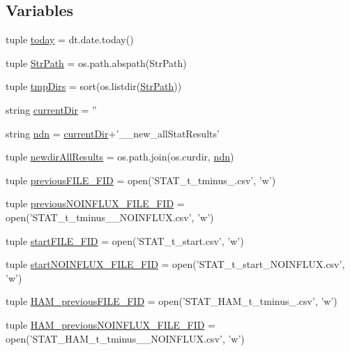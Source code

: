 \subsection*{Variables}
\begin{DoxyCompactItemize}
\item 
tuple \hyperlink{a00098_ac99ee9d8196d8a2305b9f4c795b23b97}{today} = dt.\-date.\-today()
\item 
tuple \hyperlink{a00098_ac34f3f43f888eb6620266d78ce928ceb}{Str\-Path} = os.\-path.\-abspath(Str\-Path)
\item 
tuple \hyperlink{a00098_ab71c19ee20acae0f07934a8d0e9fe50b}{tmp\-Dirs} = sort(os.\-listdir(\hyperlink{a00098_ac34f3f43f888eb6620266d78ce928ceb}{Str\-Path}))
\item 
string \hyperlink{a00098_ae98225d5c8c20399f5c3b888fa37746f}{current\-Dir} = ''
\item 
string \hyperlink{a00098_a5e117df6e0cdffdae13947622c6c4890}{ndn} = \hyperlink{a00098_ae98225d5c8c20399f5c3b888fa37746f}{current\-Dir}+'\-\_\-\_\-new\-\_\-all\-Stat\-Results'
\item 
tuple \hyperlink{a00098_a62d6cfd52b4428ab7ea4d75d43b2d49b}{newdir\-All\-Results} = os.\-path.\-join(os.\-curdir, \hyperlink{a00098_a5e117df6e0cdffdae13947622c6c4890}{ndn})
\item 
tuple \hyperlink{a00098_aba65725a1bd6d1b891b02dc7f3db2335}{previous\-F\-I\-L\-E\-\_\-\-F\-I\-D} = open('S\-T\-A\-T\-\_\-t\-\_\-tminus\-\_.\-csv', 'w')
\item 
tuple \hyperlink{a00098_a9f9485bf6f7a3734bbd110b756005b71}{previous\-N\-O\-I\-N\-F\-L\-U\-X\-\_\-\-F\-I\-L\-E\-\_\-\-F\-I\-D} = open('S\-T\-A\-T\-\_\-t\-\_\-tminus\-\_\-\_\-\-N\-O\-I\-N\-F\-L\-U\-X.\-csv', 'w')
\item 
tuple \hyperlink{a00098_a0239a9dcc4900463a0c19557bec23521}{start\-F\-I\-L\-E\-\_\-\-F\-I\-D} = open('S\-T\-A\-T\-\_\-t\-\_\-start.\-csv', 'w')
\item 
tuple \hyperlink{a00098_a44f4f158af9771fbabbbacc4f4484d32}{start\-N\-O\-I\-N\-F\-L\-U\-X\-\_\-\-F\-I\-L\-E\-\_\-\-F\-I\-D} = open('S\-T\-A\-T\-\_\-t\-\_\-start\-\_\-\-N\-O\-I\-N\-F\-L\-U\-X.\-csv', 'w')
\item 
tuple \hyperlink{a00098_a3aad86d2cdbfb6f36b4b563b190d76c9}{H\-A\-M\-\_\-previous\-F\-I\-L\-E\-\_\-\-F\-I\-D} = open('S\-T\-A\-T\-\_\-\-H\-A\-M\-\_\-t\-\_\-tminus\-\_.\-csv', 'w')
\item 
tuple \hyperlink{a00098_a621d86851e86f9c83bb0add9ec741d7f}{H\-A\-M\-\_\-previous\-N\-O\-I\-N\-F\-L\-U\-X\-\_\-\-F\-I\-L\-E\-\_\-\-F\-I\-D} = open('S\-T\-A\-T\-\_\-\-H\-A\-M\-\_\-t\-\_\-tminus\-\_\-\_\-\-N\-O\-I\-N\-F\-L\-U\-X.\-csv', 'w')

\end{DoxyCompactItemize}
